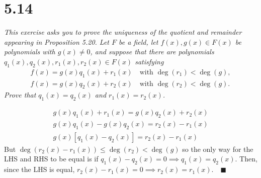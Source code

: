 \documentclass[12pt]{article}
\newcommand{\qed}{\quad \blacksquare}
\begin{document}
\section*{5.14}
   \emph{ This exercise asks you to prove the uniqueness of the quotient and remainder appearing in Proposition 5.20. Let $F$ be a field, let $f(x),g(x) \in F(x)$ be polynomials with $g(x) \neq 0$, and suppose that there are polynomials $q_1(x), q_2(x), r_1(x), r_2(x) \in F(x)$ satisfying}
    \begin{align*}
        f(x) = g(x)q_1(x) + r_1(x) \quad \text{with } \deg(r_1) < \deg(g),\\
        f(x) = g(x)q_2(x) + r_2(x) \quad \text{with } \deg(r_2) < \deg(g).
    \end{align*}
   \emph{Prove that $q_1(x) = q_2(x)$ and $r_1(x) = r_2(x)$.}

   \color{blue}
        \begin{align*}
            g(x)q_1(x) + r_1(x) = g(x)q_2(x) + r_2(x)\\
            g(x)q_1(x) - g(x)q_2(x) = r_2(x) - r_1(x)\\
            g(x)[q_1(x) - q_2(x)] = r_2(x) - r_1(x)
        \end{align*}
        But $\deg(r_2(x) - r_1(x)) \leq \deg(r_2) < \deg(g)$ so the only way for the LHS and RHS to be equal is if $q_1(x) - q_2(x) = 0 \implies q_1(x) = q_2(x)$. Then, since the LHS is equal, $r_2(x) - r_1(x) = 0 \implies r_2(x) = r_1(x). \qed$
   \color{black}
\pagebreak
\end{document}
